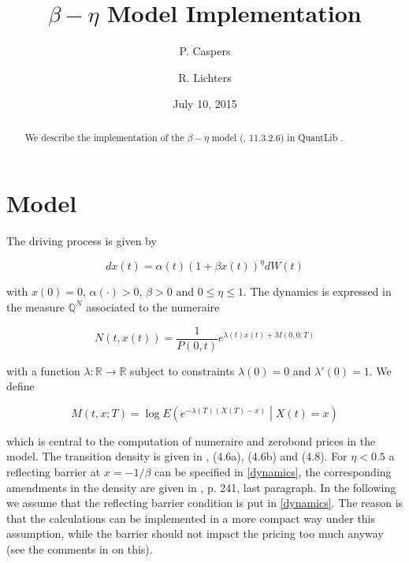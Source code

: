 \documentclass{amsart}
\theoremstyle{plain}
\numberwithin{equation}{section}
\begin{document}
\title[$\beta-\eta$ Model Implementation]{$\beta-\eta$ Model Implementation}
\author{P. Caspers}
\author{R. Lichters}
\date{July 10, 2015}
\begin{abstract}
We describe the implementation of the $\beta-\eta$ model (\cite{betaeta}, \cite{piterbarg} 11.3.2.6) in QuantLib \cite{ql}.
\end{abstract}

\maketitle

\tableofcontents

\section{Model}

The driving process is given by

\begin{equation}\label{dynamics}
dx(t) = \alpha(t) ( 1 + \beta x(t) )^\eta dW(t) 
\end{equation}

with $x(0)=0$, $\alpha(\cdot) > 0$, $\beta > 0$ and $0 \leq \eta \leq 1$. The dynamics is expressed in the measure $\mathbb{Q}^N$ associated to the numeraire

\begin{equation}
N(t,x(t)) = \frac{1}{P(0,t)}e^{\lambda(t)x(t)+M(0,0;T)}
\end{equation}

with a function $\lambda: \mathbb{R}\rightarrow\mathbb{R}$ subject to constraints $\lambda(0)=0$ and $\lambda'(0)=1$. We define

\begin{equation}\label{formula_M}
M(t,x;T) = \log E \left( e^{-\lambda(T)(X(T)-x)} \middle | X(t)=x \right)
\end{equation}

which is central to the computation of numeraire and zerobond prices in the model. The transition density is given in \cite{betaeta}, (4.6a), (4.6b) and (4.8). For $\eta < 0.5$ a reflecting barrier at $x=-1/\beta$ can be specified in \ref{dynamics}, the corresponding amendments in the density are given in \cite{betaeta}, p. 241, last paragraph. In the following we assume that the reflecting barrier condition is put in \ref{dynamics}. The reason is that the calculations can be implemented in a more compact way under this assumption, while the barrier should not impact the pricing too much anyway (see the comments in \cite{betaeta} on this). 
\end{document}
